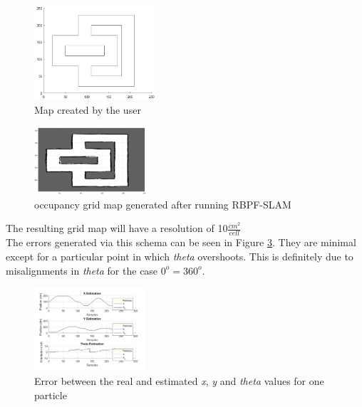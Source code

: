 \documentclass[letterpaper]{article}
\begin{document}
\begin{figure}[h]
	\centering
	\includegraphics[width=0.4\textwidth]{figures/initial_map}
	\caption{Map created by the user}
	\label{initial_map}
\end{figure}
\begin{figure}[h]
	\centering
	\includegraphics[width=0.37\textwidth]{figures/end_map}
	\caption{occupancy grid map generated after running RBPF-SLAM}
	\label{end_map}
\end{figure}

The resulting grid map will have a resolution of 10$\frac{cm^2}{cell}$ \\

The errors generated via this schema can be seen in Figure \ref{error_estimation}. They are minimal except for a particular point in which \textit{theta} overshoots. This is definitely due to misalignments in \textit{theta} for the case $0^o = 360^o$.

\begin{figure}[h]
	\centering
	\includegraphics[width=0.37\textwidth]{figures/error_estimation}
	\caption{Error between the real and estimated \textit{x}, \textit{y} and \textit{theta} values for one particle}
	\label{error_estimation}
\end{figure}
\end{document}
